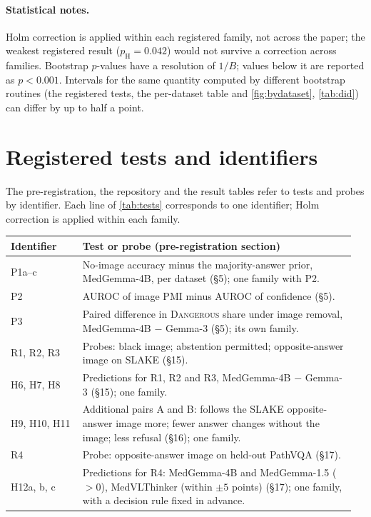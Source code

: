 \documentclass[10pt,twocolumn,letterpaper]{article}
\newcommand{\dang}{\textup{\textsc{Dangerous}}}
\begin{document}
\paragraph{Statistical notes.} Holm correction is applied within each registered family, not across the paper; the
weakest registered result ($p_{\text{H}}=0.042$) would not survive a correction across families. Bootstrap
$p$-values have a resolution of $1/B$; values below it are reported as $p<0.001$. Intervals for the same quantity
computed by different bootstrap routines (the registered tests, the per-dataset table and \cref{fig:bydataset},
\cref{tab:did}) can differ by up to half a point.

\section{Registered tests and identifiers}
\label{app:ids}
The pre-registration, the repository and the result tables refer to tests and probes by identifier. Each line of
\cref{tab:tests} corresponds to one identifier; Holm correction is applied within each family.

\smallskip\noindent\small
\begin{tabular}{@{}p{0.2\linewidth}p{0.76\linewidth}@{}}
\toprule
Identifier & Test or probe (pre-registration section)\\
\midrule
P1a--c & No-image accuracy minus the majority-answer prior, MedGemma-4B, per dataset (\S5); one family with P2.\\
P2 & AUROC of image PMI minus AUROC of confidence (\S5).\\
P3 & Paired difference in \dang{} share under image removal, MedGemma-4B $-$ Gemma-3 (\S5); its own family.\\
R1, R2, R3 & Probes: black image; abstention permitted; opposite-answer image on SLAKE (\S15).\\
H6, H7, H8 & Predictions for R1, R2 and R3, MedGemma-4B $-$ Gemma-3 (\S15); one family.\\
H9, H10, H11 & Additional pairs A and B: follows the SLAKE opposite-answer image more; fewer answer changes without the image; less refusal (\S16); one family.\\
R4 & Probe: opposite-answer image on held-out PathVQA (\S17).\\
H12a, b, c & Predictions for R4: MedGemma-4B and MedGemma-1.5 ($>0$), MedVLThinker (within $\pm5$ points) (\S17); one family, with a decision rule fixed in advance.\\
\bottomrule
\end{tabular}
\end{document}

